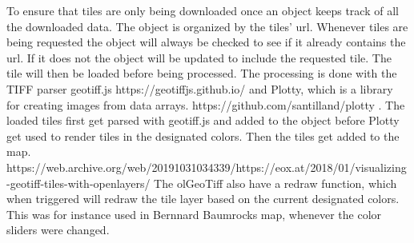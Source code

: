 To ensure that tiles are only being downloaded once an object keeps track of all the downloaded data. The object is organized by the tiles’ url. 
Whenever tiles are being requested the object will always be checked to see if it already contains the url. If it does not the object will be updated to include the requested tile. The tile will then be loaded before being processed. 
The processing is done with the TIFF parser geotiff.js 
https://geotiffjs.github.io/
and Plotty, which is a library for creating images from data arrays.
https://github.com/santilland/plotty
. The loaded tiles first get parsed with geotiff.js and added to the object before Plotty get used to render tiles in the designated colors. Then the tiles get added to the map.
\citep{BThesis}
https://web.archive.org/web/20191031034339/https://eox.at/2018/01/visualizing-geotiff-tiles-with-openlayers/
The olGeoTiff also have a redraw function, which when triggered will redraw the tile layer based on the current designated colors. This was for instance used in Bernnard Baumrocks map, whenever the color sliders were changed. 

% 
